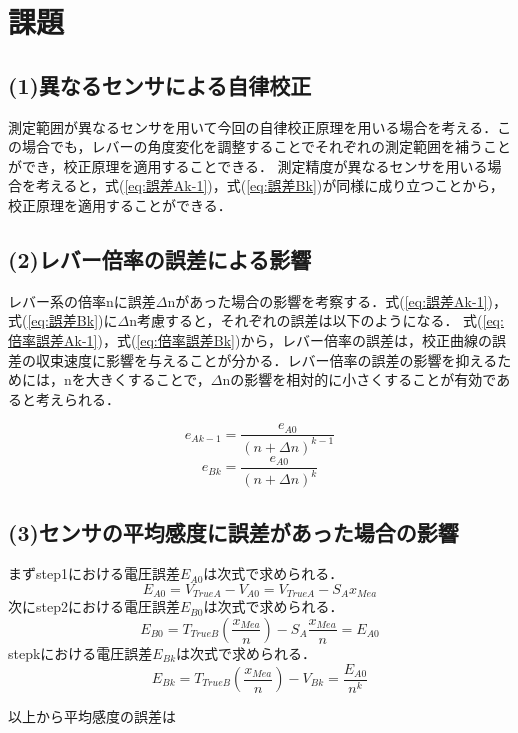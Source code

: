 \section{課題}

\subsection{(1)異なるセンサによる自律校正}
測定範囲が異なるセンサを用いて今回の自律校正原理を用いる場合を考える．この場合でも，レバーの角度変化を調整することでそれぞれの測定範囲を補うことができ，校正原理を適用することできる．
測定精度が異なるセンサを用いる場合を考えると，式(\ref{eq:誤差Ak-1})，式(\ref{eq:誤差Bk})が同様に成り立つことから，校正原理を適用することができる．

\subsection{(2)レバー倍率の誤差による影響}
レバー系の倍率nに誤差$\Delta$nがあった場合の影響を考察する．式(\ref{eq:誤差Ak-1})，式(\ref{eq:誤差Bk})に$\Delta$n考慮すると，それぞれの誤差は以下のようになる．
式(\ref{eq:倍率誤差Ak-1})，式(\ref{eq:倍率誤差Bk})から，レバー倍率の誤差は，校正曲線の誤差の収束速度に影響を与えることが分かる．レバー倍率の誤差の影響を抑えるためには，nを大きくすることで，$\Delta$nの影響を相対的に小さくすることが有効であると考えられる．

\begin{equation}
    e_{Ak-1} = \frac{e_{A0}}{(n + \Delta n)^{k-1}}
    \label{eq:倍率誤差Ak-1}
\end{equation}
\begin{equation}
    e_{Bk} = \frac{e_{A0}}{(n + \Delta n)^{k}}
    \label{eq:倍率誤差Bk}
\end{equation}

\subsection{(3)センサの平均感度に誤差があった場合の影響}
まずstep1における電圧誤差$E_{A0}$は次式で求められる．
\begin{equation}
    E_{A0} = V_{TrueA} - V_{A0} = V_{TrueA} - S_Ax_{Mea}
    \label{eq:電圧誤差A0}
\end{equation}
次にstep2における電圧誤差$E_{B0}$は次式で求められる．
\begin{equation}
    E_{B0} = T_{TrueB}(\frac{x_{Mea}}{n}) - S_A\frac{x_{Mea}}{n} = E_{A0}
    \label{eq:電圧誤差B0}
\end{equation}
stepkにおける電圧誤差$E_{Bk}$は次式で求められる．
\begin{equation}
    E_{Bk} = T_{TrueB}(\frac{x_{Mea}}{n}) - V_{Bk} = \frac{E_{A0}}{n^k}
    \label{eq:電圧誤差Bk}
\end{equation}

以上から平均感度の誤差は
